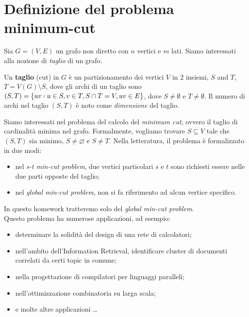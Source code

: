 \section{Definizione del problema minimum-cut}
\label{cap:problem-definition}

Sia $ G = (V,E) $ un grafo non diretto con $ n $ vertici e $ m $ lati. Siamo interessati alla nozione di \textit{taglio} di un grafo.

\begin{defn}
Un \textbf{taglio} (cut) in $ G $ è un partizionamento dei vertici $ V $ in 2 insiemi, $ S $ and $ T $, $ T=V(G) \setminus S$, dove gli archi di un taglio sono $(S, T) = \{ uv \shortmid u \in S, v \in T, S \cap T = V, uv \in E \}$,
dove $ S \neq \emptyset $ e $ T \neq \emptyset $. Il numero di archi nel taglio $ (S,T) $ è noto come \textit{dimensione} del taglio.
\end{defn}

\noindent Siamo interessati nel problema del calcolo del \textit{minimum cut}, ovvero il taglio di cardinalità minima nel grafo.
Formalmente, vogliamo trovare $ S\subseteq V $ tale che $ (S, T) $ sia minimo, $ S \neq \varnothing $ e $ S \neq T $.
Nella letteratura, il problema è formalizzato in due modi:

\begin{itemize}
    \item nel \textit{s-t min-cut problem}, due vertici particolari $s$ e $t$ sono richiesti essere nelle due parti opposte del taglio;
    \item nel \textit{global min-cut problem}, non si fa riferimento ad alcun vertice specifico.
\end{itemize}

\noindent In questo homework tratteremo solo del \textit{global min-cut problem}. \\
\noindent Questo problema ha numerose applicazioni, ad esempio:

\begin{itemize}
    \item determinare la solidità del design di una rete di calcolatori;
    \item nell'ambito dell'Information Retrieval, identificare cluster di documenti correlati da certi topic in comune;
    \item nella progettazione di compilatori per linguaggi paralleli;
    \item nell'ottimizzazione combinatoria su larga scala;
    \item e molte altre applicazioni \ldots
\end{itemize}
